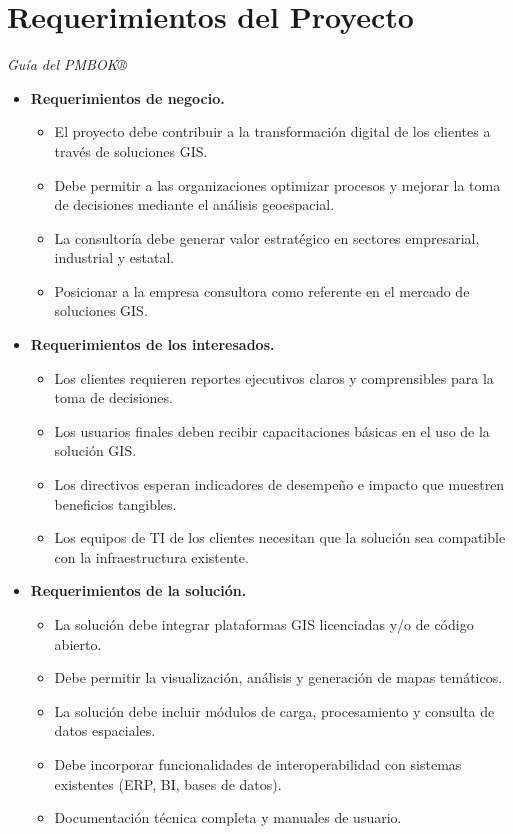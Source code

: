 \section{Requerimientos del Proyecto}
\textit{Guía del PMBOK®}
\begin{itemize}
  \item \textbf{Requerimientos de negocio.}
  \begin{itemize}
    \item El proyecto debe contribuir a la transformación digital de los clientes a través de soluciones GIS.
    \item Debe permitir a las organizaciones optimizar procesos y mejorar la toma de decisiones mediante el análisis geoespacial.
    \item La consultoría debe generar valor estratégico en sectores empresarial, industrial y estatal.
    \item Posicionar a la empresa consultora como referente en el mercado de soluciones GIS.
  \end{itemize}

  \item \textbf{Requerimientos de los interesados.}
  \begin{itemize}
    \item Los clientes requieren reportes ejecutivos claros y comprensibles para la toma de decisiones.
    \item Los usuarios finales deben recibir capacitaciones básicas en el uso de la solución GIS.
    \item Los directivos esperan indicadores de desempeño e impacto que muestren beneficios tangibles.
    \item Los equipos de TI de los clientes necesitan que la solución sea compatible con la infraestructura existente.
  \end{itemize}

  \item \textbf{Requerimientos de la solución.}
  \begin{itemize}
    \item La solución debe integrar plataformas GIS licenciadas y/o de código abierto.
    \item Debe permitir la visualización, análisis y generación de mapas temáticos.
    \item La solución debe incluir módulos de carga, procesamiento y consulta de datos espaciales.
    \item Debe incorporar funcionalidades de interoperabilidad con sistemas existentes (ERP, BI, bases de datos).
    \item Documentación técnica completa y manuales de usuario.
  \end{itemize}


\end{itemize}
